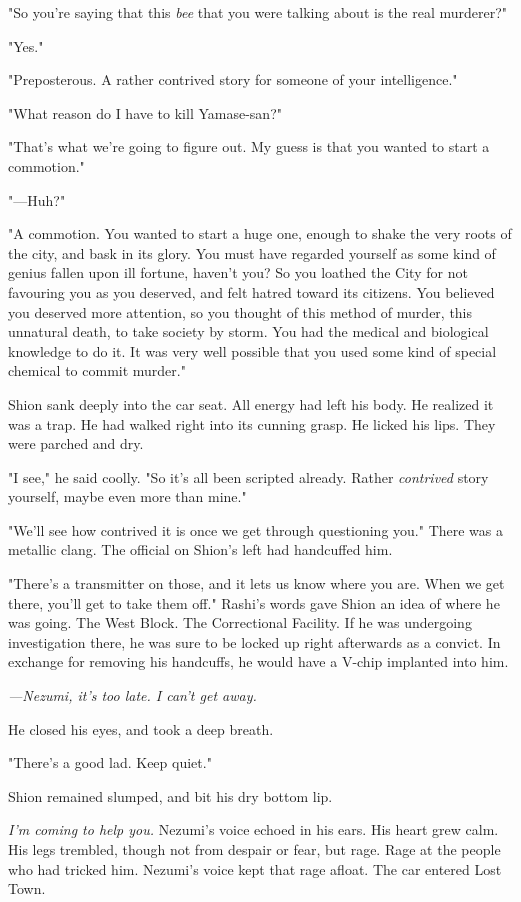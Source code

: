 "So you're saying that this \emph{bee} that you were talking about is the real
murderer?"

"Yes."

"Preposterous. A rather contrived story for someone of your
intelligence."

"What reason do I have to kill Yamase-san?"

"That's what we're going to figure out. My guess is that you wanted to
start a commotion."

"---Huh?"

"A commotion. You wanted to start a huge one, enough to shake the very
roots of the city, and bask in its glory. You must have regarded
yourself as some kind of genius fallen upon ill fortune, haven't you? So
you loathed the City for not favouring you as you deserved, and felt
hatred toward its citizens. You believed you deserved more attention, so
you thought of this method of murder, this unnatural death, to take
society by storm. You had the medical and biological knowledge to do it.
It was very well possible that you used some kind of special chemical to
commit murder."

Shion sank deeply into the car seat. All energy had left his body. He
realized it was a trap. He had walked right into its cunning grasp. He
licked his lips. They were parched and dry.

"I see," he said coolly. "So it's all been scripted already. Rather
\emph{contrived} story yourself, maybe even more than mine."

"We'll see how contrived it is once we get through questioning you."
There was a metallic clang. The official on Shion's left had handcuffed
him.

"There's a transmitter on those, and it lets us know where you are. When
we get there, you'll get to take them off." Rashi's words gave Shion an
idea of where he was going. The West Block. The Correctional Facility.
If he was undergoing investigation there, he was sure to be locked up
right afterwards as a convict. In exchange for removing his handcuffs,
he would have a V-chip implanted into him.

\emph{---Nezumi, it's too late. I can't get away.}

He closed his eyes, and took a deep breath.

"There's a good lad. Keep quiet."

Shion remained slumped, and bit his dry bottom lip.

\emph{I'm coming to help you.} Nezumi's voice echoed in his ears. His heart
grew calm. His legs trembled, though not from despair or fear, but rage.
Rage at the people who had tricked him. Nezumi's voice kept that rage
afloat. The car entered Lost Town.

